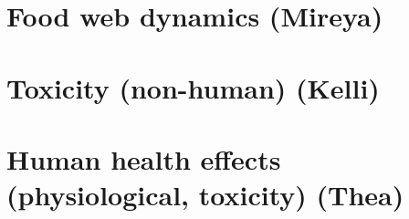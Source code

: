 \documentclass{article}\usepackage[]{graphicx}\usepackage[]{color}
\begin{document}
\section{Food web dynamics (Mireya)}

\section{Toxicity (non-human) (Kelli)}



\section{Human health effects (physiological, toxicity) (Thea)}

\end{document}
